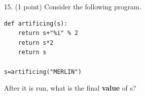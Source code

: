 \documentclass{article}
\begin{document}
\noindent
\begin{minipage}{\textwidth}
15. (1 point)
Consider the following program.
\begin{verbatim}
def artificing(s):
    return s+"%i" % 2
    return s*2
    return s

s=artificing("MERLIN")
\end{verbatim}
After it is run, what is the final \textbf{value} of s?

\end{minipage}
\vspace{2em}
\filbreak\vfil{}\vfilneg
\end{document}

